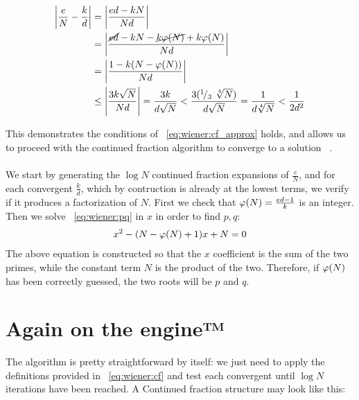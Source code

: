 \begin{align*}
  \left|\frac{e}{N} - \frac{k}{d}\right| &= \left|\frac{ed - kN}{Nd}\right| \\
  &= \left|\frac{\cancel{ed} -kN - \cancel{k\varphi(N)} + k\varphi(N)}{Nd}\right| \\
  &= \left|\frac{1-k(N-\varphi(N))}{Nd}\right| \\
  &\leq \left|\frac{3k\sqrt{N}}{Nd}\right|
  = \frac{3k}{d\sqrt{N}}
  < \frac{3({}^{1}\!/_{3}\ \sqrt[4]{N})}{d\sqrt{N}}
  = \frac{1}{d\sqrt[4]{N}} < \frac{1}{2d^2}
\end{align*}

This demonstrates the conditions of ~\ref{eq:wiener:cf_approx} holds, and allows
us to proceed with the continued fraction algorithm to converge to a solution
~\cite{20years}.

\paragraph{}
We start by generating the $\log N$ continued fraction expansions of
$\frac{e}{N}$, and for each convergent $\frac{k}{d}$,
which by contruction is already at the lowest terms, we verify if it produces a
factorization of $N$.
First we check that $\varphi(N) = \frac{ed-1}{k}$ is
an integer. Then we solve ~\ref{eq:wiener:pq} in $x$ in order to find $p, q$:
\begin{align}
  \label{eq:wiener:pq}
  x^2 - (N - \varphi(N) + 1)x + N = 0
\end{align}
The above equation is constructed so that the $x$ coefficient is the sum of the
two primes, while the constant term $N$ is the product of the two. Therefore, if
$\varphi(N)$ has been correctly guessed, the two roots will be $p$ and $q$.

\section{Again on the engine™}

The algorithm is pretty straightforward by itself: we just need to apply the
definitions provided in ~\ref{eq:wiener:cf} and test each convergent until
$\log N$ iterations have been reached.
A Continued fraction structure may look like this:

